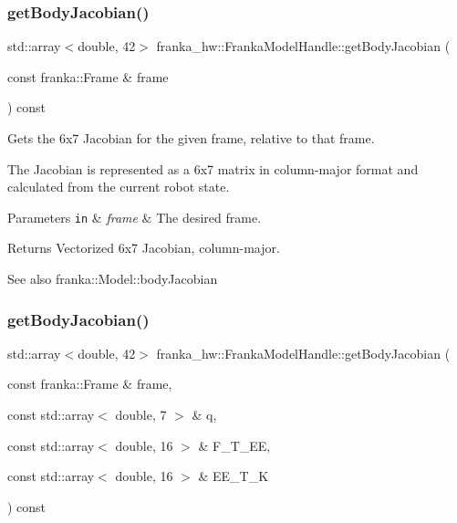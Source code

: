 \subsubsection{\texorpdfstring{get\+Body\+Jacobian()}{getBodyJacobian()}\hspace{0.1cm}{\footnotesize\ttfamily [1/2]}}
{\footnotesize\ttfamily std\+::array$<$double, 42$>$ franka\+\_\+hw\+::\+Franka\+Model\+Handle\+::get\+Body\+Jacobian (\begin{DoxyParamCaption}\item[{const franka\+::\+Frame \&}]{frame }\end{DoxyParamCaption}) const\hspace{0.3cm}{\ttfamily [inline]}}

Gets the 6x7 Jacobian for the given frame, relative to that frame.

The Jacobian is represented as a 6x7 matrix in column-\/major format and calculated from the current robot state.


\begin{DoxyParams}[1]{Parameters}
\mbox{\tt in}  & {\em frame} & The desired frame.\\
\hline
\end{DoxyParams}
\begin{DoxyReturn}{Returns}
Vectorized 6x7 Jacobian, column-\/major.
\end{DoxyReturn}
\begin{DoxySeeAlso}{See also}
franka\+::\+Model\+::body\+Jacobian 
\end{DoxySeeAlso}
\mbox{\label{classfranka__hw_1_1_franka_model_handle_a1b5ba63881c0dc365590c6e116576704}} 
\subsubsection{\texorpdfstring{get\+Body\+Jacobian()}{getBodyJacobian()}\hspace{0.1cm}{\footnotesize\ttfamily [2/2]}}
{\footnotesize\ttfamily std\+::array$<$double, 42$>$ franka\+\_\+hw\+::\+Franka\+Model\+Handle\+::get\+Body\+Jacobian (\begin{DoxyParamCaption}\item[{const franka\+::\+Frame \&}]{frame,  }\item[{const std\+::array$<$ double, 7 $>$ \&}]{q,  }\item[{const std\+::array$<$ double, 16 $>$ \&}]{F\+\_\+\+T\+\_\+\+EE,  }\item[{const std\+::array$<$ double, 16 $>$ \&}]{E\+E\+\_\+\+T\+\_\+K }\end{DoxyParamCaption}) const\hspace{0.3cm}{\ttfamily [inline]}}

